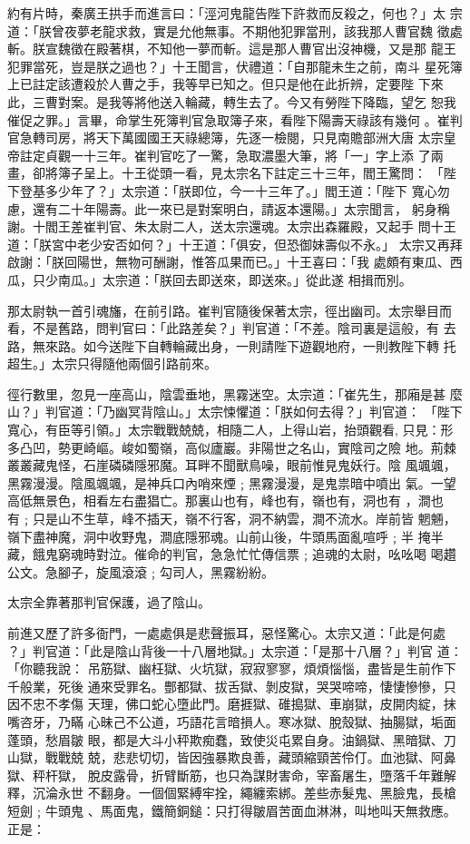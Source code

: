 \begin{pinyinscope}
{約有片時，秦廣王拱手而進言曰：「涇河鬼龍告陛下許救而反殺之，何也？」太
宗道：「朕曾夜夢老龍求救，實是允他無事。不期他犯罪當刑，該我那人曹官魏
徵處斬。朕宣魏徵在殿著棋，不知他一夢而斬。這是那人曹官出沒神機，又是那
龍王犯罪當死，豈是朕之過也？」十王聞言，伏禮道：「自那龍未生之前，南斗
星死簿上已註定該遭殺於人曹之手，我等早已知之。但只是他在此折辨，定要陛
下來此，三曹對案。是我等將他送入輪藏，轉生去了。今又有勞陛下降臨，望乞
恕我催促之罪。」言畢，命掌生死簿判官急取簿子來，看陛下陽壽天祿該有幾何
。崔判官急轉司房，將天下萬國國王天祿總簿，先逐一檢閱，只見南贍部洲大唐
太宗皇帝註定貞觀一十三年。崔判官吃了一驚，急取濃墨大筆，將「一」字上添
了兩畫，卻將簿子呈上。十王從頭一看，見太宗名下註定三十三年，閻王驚問：
「陛下登基多少年了？」太宗道：「朕即位，今一十三年了。」閻王道：「陛下
寬心勿慮，還有二十年陽壽。此一來已是對案明白，請返本還陽。」太宗聞言，
躬身稱謝。十閻王差崔判官、朱太尉二人，送太宗還魂。太宗出森羅殿，又起手
問十王道：「朕宮中老少安否如何？」十王道：「俱安，但恐御妹壽似不永。」
太宗又再拜啟謝：「朕回陽世，無物可酬謝，惟答瓜果而已。」十王喜曰：「我
處頗有東瓜、西瓜，只少南瓜。」太宗道：「朕回去即送來，即送來。」從此遂
相揖而別。

那太尉執一首引魂旛，在前引路。崔判官隨後保著太宗，徑出幽司。太宗舉目而
看，不是舊路，問判官曰：「此路差矣？」判官道：「不差。陰司裏是這般，有
去路，無來路。如今送陛下自轉輪藏出身，一則請陛下遊觀地府，一則教陛下轉
托超生。」太宗只得隨他兩個引路前來。

徑行數里，忽見一座高山，陰雲垂地，黑霧迷空。太宗道：「崔先生，那廂是甚
麼山？」判官道：「乃幽冥背陰山。」太宗悚懼道：「朕如何去得？」判官道：
「陛下寬心，有臣等引領。」太宗戰戰兢兢，相隨二人，上得山岩，抬頭觀看,
只見：形多凸凹，勢更崎嶇。峻如蜀嶺，高似廬巖。非陽世之名山，實陰司之險
地。荊棘叢叢藏鬼怪，石崖磷磷隱邪魔。耳畔不聞獸鳥噪，眼前惟見鬼妖行。陰
風颯颯，黑霧漫漫。陰風颯颯，是神兵口內哨來煙﹔黑霧漫漫，是鬼祟暗中噴出
氣。一望高低無景色，相看左右盡猖亡。那裏山也有，峰也有，嶺也有，洞也有
，澗也有﹔只是山不生草，峰不插天，嶺不行客，洞不納雲，澗不流水。岸前皆
魍魎，嶺下盡神魔，洞中收野鬼，澗底隱邪魂。山前山後，牛頭馬面亂喧呼﹔半
掩半藏，餓鬼窮魂時對泣。催命的判官，急急忙忙傳信票﹔追魂的太尉，吆吆喝
喝趲公文。急腳子，旋風滾滾﹔勾司人，黑霧紛紛。

太宗全靠著那判官保護，過了陰山。

前進又歷了許多衙門，一處處俱是悲聲振耳，惡怪驚心。太宗又道：「此是何處
？」判官道：「此是陰山背後一十八層地獄。」太宗道：「是那十八層？」判官
道：「你聽我說：
吊筋獄、幽枉獄、火坑獄，寂寂寥寥，煩煩惱惱，盡皆是生前作下千般業，死後
通來受罪名。酆都獄、拔舌獄、剝皮獄，哭哭啼啼，悽悽慘慘，只因不忠不孝傷
天理，佛口蛇心墮此門。磨捱獄、碓搗獄、車崩獄，皮開肉綻，抹嘴咨牙，乃瞞
心昧己不公道，巧語花言暗損人。寒冰獄、脫殼獄、抽腸獄，垢面蓬頭，愁眉皺
眼，都是大斗小秤欺痴蠢，致使災屯累自身。油鍋獄、黑暗獄、刀山獄，戰戰兢
兢，悲悲切切，皆因強暴欺良善，藏頭縮頸苦伶仃。血池獄、阿鼻獄、秤杆獄，
脫皮露骨，折臂斷筋，也只為謀財害命，宰畜屠生，墮落千年難解釋，沉淪永世
不翻身。一個個緊縛牢拴，繩纏索綁。差些赤髮鬼、黑臉鬼，長槍短劍﹔牛頭鬼
、馬面鬼，鐵簡銅鎚：只打得皺眉苦面血淋淋，叫地叫天無救應。正是：

}
\end{pinyinscope}
